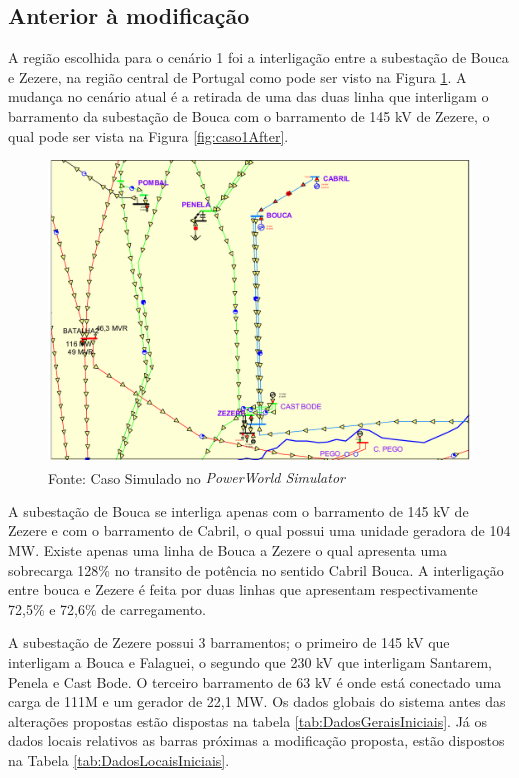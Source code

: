 \subsection{Anterior à modificação}

A região escolhida para o cenário 1 foi a interligação entre a subestação de Bouca e Zezere, na região central de Portugal como pode ser visto na Figura \ref{fig:caso1}. A mudança no cenário atual é a retirada de uma das duas linha que interligam o barramento da subestação de Bouca com o barramento de 145 kV de Zezere, o qual pode ser vista na Figura \ref{fig:caso1After}.

\vspace{3.3mm}

\begin{figure}[H]
	\centering
	\captionsetup{width=1\textwidth, font=footnotesize, textfont=bf}	
	\includegraphics[width=1\linewidth]{img/caso1.pdf}
	\caption{Cenário 1, anterior à modificação}
	\vspace{-3.5mm}
	\caption*{Fonte: Caso Simulado no \textit{PowerWorld\textsuperscript{\textregistered} Simulator}}
	\label{fig:caso1}
\end{figure}

A subestação de Bouca se interliga apenas com o barramento de 145 kV de Zezere e com o barramento de Cabril, o qual possui uma unidade geradora de 104 MW. Existe apenas uma linha de Bouca a Zezere o qual apresenta uma sobrecarga 128\% no transito de potência no sentido Cabril Bouca. A interligação entre bouca e Zezere é feita por duas linhas que apresentam respectivamente  72,5\% e 72,6\% de carregamento.

A subestação de Zezere possui 3 barramentos; o primeiro de 145 kV que interligam a Bouca e Falaguei, o segundo que 230 kV que interligam Santarem, Penela e Cast Bode. O terceiro barramento de 63 kV é onde está conectado uma carga de 111M e um gerador de 22,1 MW. Os dados globais do sistema antes das alterações propostas estão dispostas na tabela \ref{tab:DadosGeraisIniciais}. Já os dados locais relativos as barras próximas a modificação proposta, estão dispostos na Tabela \ref{tab:DadosLocaisIniciais}.


